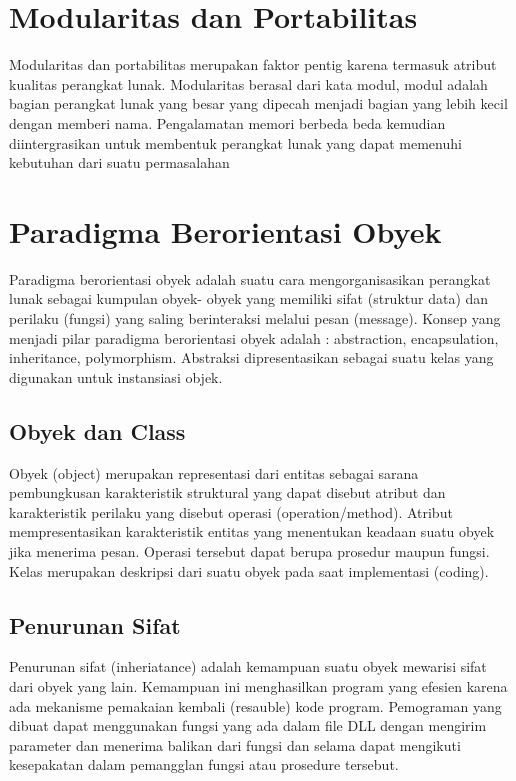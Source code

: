 

\section{Modularitas dan Portabilitas}
Modularitas dan portabilitas merupakan faktor pentig karena termasuk atribut kualitas perangkat lunak. Modularitas berasal dari kata modul, modul adalah bagian perangkat lunak yang besar yang dipecah menjadi bagian yang lebih kecil dengan memberi nama. Pengalamatan memori berbeda beda kemudian diintergrasikan untuk membentuk perangkat lunak yang dapat memenuhi kebutuhan dari suatu permasalahan

\section{Paradigma Berorientasi Obyek}
Paradigma berorientasi obyek adalah suatu cara mengorganisasikan perangkat lunak sebagai kumpulan obyek- obyek yang memiliki sifat (struktur data) dan perilaku (fungsi) yang saling berinteraksi melalui pesan (message). Konsep yang menjadi pilar paradigma berorientasi obyek adalah : abstraction, encapsulation, inheritance, polymorphism. Abstraksi dipresentasikan sebagai suatu kelas yang digunakan untuk instansiasi objek.

\subsection{Obyek dan Class}
Obyek (object) merupakan representasi dari entitas sebagai sarana pembungkusan karakteristik struktural
yang dapat disebut atribut dan karakteristik perilaku yang disebut operasi (operation/method). Atribut 
mempresentasikan karakteristik entitas yang menentukan keadaan suatu obyek jika menerima pesan.
Operasi tersebut dapat berupa prosedur maupun fungsi. Kelas merupakan deskripsi dari suatu obyek pada 
saat implementasi (coding).


\subsection{Penurunan Sifat}
Penurunan sifat (inheriatance) adalah kemampuan suatu obyek mewarisi sifat dari obyek yang lain. Kemampuan ini menghasilkan program yang efesien karena ada mekanisme pemakaian kembali (resauble) kode program. Pemograman yang dibuat dapat menggunakan fungsi yang ada dalam file DLL dengan mengirim parameter dan menerima balikan dari fungsi dan selama dapat mengikuti kesepakatan dalam pemangglan fungsi atau prosedure tersebut.


